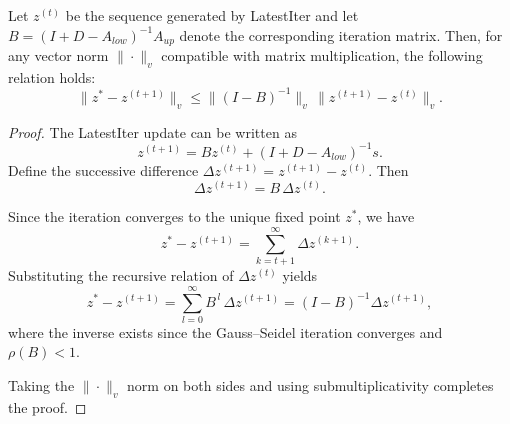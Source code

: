 \documentclass[sigconf,review, nonacm]{acmart}
\newcommand\s{\boldsymbol{\mathit{s}}}
\newcommand\zz{\boldsymbol{\mathit{z}}}
\renewcommand\AA{\boldsymbol{\mathit{A}}}
\newcommand\BB{\boldsymbol{\mathit{B}}}
\newcommand\DD{\boldsymbol{\mathit{D}}}
\newcommand\II{\boldsymbol{\mathit{I}}}
\begin{document}
\begin{lemma}
	\label{lem:equiv-error}
	Let $\zz^{(t)}$ be the sequence generated by LatestIter and let
	$\BB = (\II+\DD-\AA_{low})^{-1}\AA_{up}$ denote the corresponding iteration matrix.
	Then, for any vector norm $\|\cdot\|_v$ compatible with matrix multiplication,
	the following relation holds:
	\begin{equation}
		\|\zz^{*}-\zz^{(t+1)}\|_v
		\le
		\|(\II-\BB)^{-1}\|_v \,
		\|\zz^{(t+1)}-\zz^{(t)}\|_v.
	\end{equation}
\end{lemma}

\begin{proof}
	The LatestIter update can be written as
	\[
	\zz^{(t+1)} = \BB \zz^{(t)} + (\II+\DD-\AA_{low})^{-1}\s.
	\]
	Define the successive difference $\Delta\zz^{(t+1)}=\zz^{(t+1)}-\zz^{(t)}$.
	Then
	\[
	\Delta\zz^{(t+1)} = \BB\,\Delta\zz^{(t)}.
	\]
	
	Since the iteration converges to the unique fixed point $\zz^*$, we have
	\[
	\zz^{*}-\zz^{(t+1)}
	=
	\sum_{k=t+1}^{\infty} \Delta\zz^{(k+1)}.
	\]
	Substituting the recursive relation of $\Delta\zz^{(t)}$ yields
	\[
	\zz^{*}-\zz^{(t+1)}
	=
	\sum_{l=0}^{\infty} \BB^{\,l}\,\Delta\zz^{(t+1)}
	=
	(\II-\BB)^{-1}\Delta\zz^{(t+1)},
	\]
	where the inverse exists since the Gauss--Seidel iteration converges and
	$\rho(\BB)<1$.
	
	Taking the $\|\cdot\|_v$ norm on both sides and using submultiplicativity
	completes the proof.
\end{proof}
\end{document}
